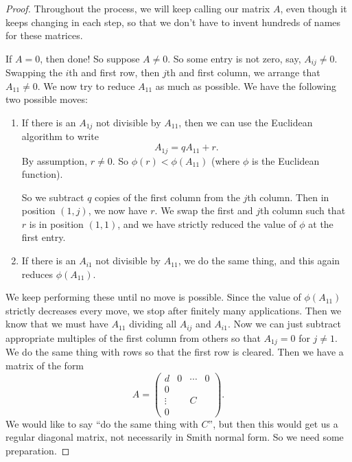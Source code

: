 \documentclass[a4paper]{article}
\begin{document}
\begin{proof}
  Throughout the process, we will keep calling our matrix $A$, even though it keeps changing in each step, so that we don't have to invent hundreds of names for these matrices.

  If $A = 0$, then done! So suppose $A \not= 0$. So some entry is not zero, say, $A_{ij} \not= 0$. Swapping the $i$th and first row, then $j$th and first column, we arrange that $A_{11} \not= 0$. We now try to reduce $A_{11}$ as much as possible. We have the following two possible moves:
  \begin{enumerate}
    \item If there is an $A_{1j}$ not divisible by $A_{11}$, then we can use the Euclidean algorithm to write
      \[
        A_{1j} = q A_{11} + r.
      \]
      By assumption, $r \not= 0$. So $\phi(r) < \phi(A_{11})$ (where $\phi$ is the Euclidean function).

      So we subtract $q$ copies of the first column from the $j$th column. Then in position $(1, j)$, we now have $r$. We swap the first and $j$th column such that $r$ is in position $(1, 1)$, and we have strictly reduced the value of $\phi$ at the first entry.
    \item If there is an $A_{i1}$ not divisible by $A_{11}$, we do the same thing, and this again reduces $\phi(A_{11})$.
  \end{enumerate}
  We keep performing these until no move is possible. Since the value of $\phi(A_{11})$ strictly decreases every move, we stop after finitely many applications. Then we know that we must have $A_{11}$ dividing all $A_{ij}$ and $A_{i1}$. Now we can just subtract appropriate multiples of the first column from others so that $A_{1j} = 0$ for $j \not= 1$. We do the same thing with rows so that the first row is cleared. Then we have a matrix of the form
  \[
    A = \begin{pmatrix}
      d & 0 & \cdots & 0\\
      0 \\
      \vdots & & C\\
      0
    \end{pmatrix}.
  \]
  We would like to say ``do the same thing with $C$'', but then this would get us a regular diagonal matrix, not necessarily in Smith normal form. So we need some preparation.


\end{proof}
\end{document}
